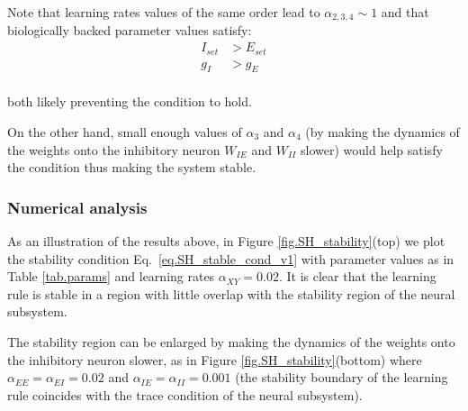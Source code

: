 \documentclass[
twocolumn,
]{article}
\newcommand{\EE}{\mathit{EE}}
\newcommand{\EI}{\mathit{EI}}
\newcommand{\IE}{\mathit{IE}}
\newcommand{\II}{\mathit{II}}
\newcommand{\XY}{\mathit{XY}}
\newcommand{\set}{\mathit{set}}
\begin{document}
Note that learning rates values of the same order lead to $\alpha_{2,3,4} \sim 1$ and that biologically backed parameter values satisfy: 
\begin{displaymath}
\begin{aligned}
I_{\set} & > E_{\set} \\
g_I & > g_E \\
\end{aligned}
\end{displaymath}

\noindent both likely preventing the condition to hold.

On the other hand, small enough values of $\alpha_3$ and $\alpha_4$ (by making the dynamics of the weights onto the inhibitory neuron $W_{\IE}$ and $W_{\II}$ slower) would help satisfy the condition thus making the system stable.



\subsubsection{Numerical analysis}

As an illustration of the results above, in Figure \ref{fig.SH_stability}(top) we plot the stability condition Eq.\ \ref{eq.SH_stable_cond_v1} with parameter values as in Table \ref{tab.params} and learning rates $\alpha_{\XY} = 0.02$. It is clear that the learning rule is stable in a region with little overlap with the stability region of the neural subsystem.

The stability region can be enlarged by making the dynamics of the weights onto the inhibitory neuron slower, as in Figure \ref{fig.SH_stability}(bottom) where $\alpha_{\EE}=\alpha_{\EI}=0.02$ and $\alpha_{\IE}=\alpha_{\II}=0.001$ (the stability boundary of the learning rule coincides with the trace condition of the neural subsystem).
\end{document}
